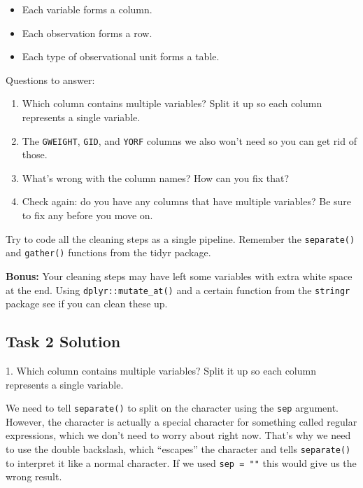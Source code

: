 \documentclass[]{book}
\providecommand{\tightlist}{%
  \setlength{\itemsep}{0pt}\setlength{\parskip}{0pt}}
\begin{document}
\begin{itemize}
\tightlist
\item
  Each variable forms a column.
\item
  Each observation forms a row.
\item
  Each type of observational unit forms a table.
\end{itemize}

Questions to answer:

\begin{enumerate}
\def\labelenumi{\arabic{enumi}.}
\tightlist
\item
  Which column contains multiple variables? Split it up so each column represents a single variable.
\item
  The \texttt{GWEIGHT}, \texttt{GID}, and \texttt{YORF} columns we also won't need so you can get rid of those.
\item
  What's wrong with the column names? How can you fix that?
\item
  Check again: do you have any columns that have multiple variables? Be sure to fix any before you move on.
\end{enumerate}

Try to code all the cleaning steps as a single pipeline. Remember the \texttt{separate()} and \texttt{gather()} functions from the tidyr package.

\textbf{Bonus:} Your cleaning steps may have left some variables with extra white space at the end. Using \texttt{dplyr::mutate\_at()} and a certain function from the \texttt{stringr} package see if you can clean these up.

\hypertarget{task-2-solution}{%
\subsection*{Task 2 Solution}\label{task-2-solution}}

1. Which column contains multiple variables? Split it up so each column represents a single variable.

We need to tell \texttt{separate()} to split on the \texttt{\textbar{}\textbar{}} character using the \texttt{sep} argument. However, the \texttt{\textbar{}} character is actually a special character for something called regular expressions, which we don't need to worry about right now. That's why we need to use the double backslash, which ``escapes'' the \texttt{\textbar{}} character and tells \texttt{separate()} to interpret it like a normal character. If we used \texttt{sep\ =\ "\textbar{}\textbar{}"} this would give us the wrong result.
\end{document}
